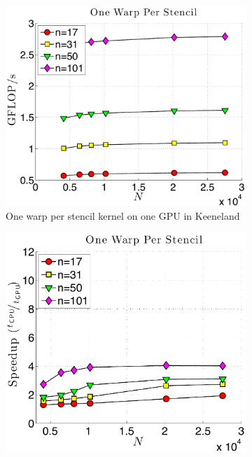 \begin{figure}
\begin{subfigure}[t]{0.425\textwidth}
\includegraphics[width=\textwidth]{../figures/keeneland_results/alltoallv_cosine/gflops_gpu_1proc_oneWarpPerStencil.pdf}
\caption{One warp per stencil kernel on one GPU in Keeneland}
\label{fig:gflops_gpu_1proc_oneWarp_keeneland}
\end{subfigure} 
\quad
\begin{subfigure}[t]{0.425\textwidth}
\includegraphics[width=\textwidth]{../figures/keeneland_results/alltoallv_cosine/speedup_1proc_oneWarpPerStencil.pdf}

\end{subfigure}
\end{figure}
